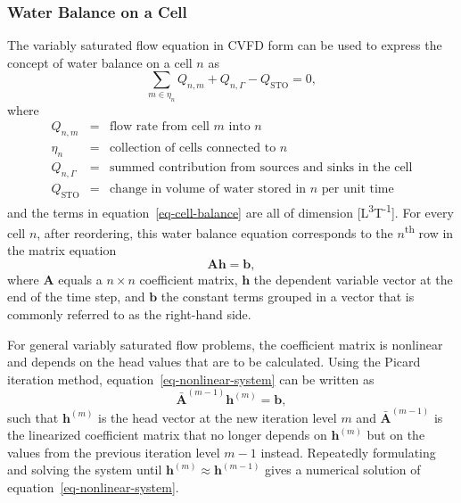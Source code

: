 \documentclass[fleqn]{article}
\begin{document}
\subsubsection*{Water Balance on a Cell}
The variably saturated flow equation in CVFD form can be used to
express the concept of water balance on a cell $n$ as
\begin{equation}
  \sum_{m \in \eta_n} Q_{n,m} + Q_{n, \Gamma} - Q_{\textrm{STO}} = 0,
  \label{eq-cell-balance}
\end{equation}
where
\begin{eqnarray*}
  Q_{n,m} &=& \text{flow rate from cell $m$ into $n$} \\
  \eta_n &=& \text{collection of cells connected to $n$} \\
  Q_{n,\Gamma} &=& \text{summed contribution from sources and sinks in the cell} \\
  Q_{\textrm{STO}} &=& \text{change in volume of water stored in $n$ per unit time}
\end{eqnarray*}
and the terms in equation~\ref{eq-cell-balance} are all of dimension
[L\textsuperscript{3}T\textsuperscript{-1}]. For every cell $n$, after
reordering, this water balance equation corresponds to the 
$n$\textsuperscript{th} row in the matrix equation
\begin{equation}
  \mathbf{A}\mathbf{h} = \mathbf{b},
  \label{eq-nonlinear-system}
\end{equation}
where $\mathbf{A}$ equals a $n \times n$ coefficient matrix, $\mathbf{h}$
the dependent variable vector at the end of the time step, and
$\mathbf{b}$ the constant terms grouped in a vector that is commonly
referred to as the right-hand side. 

For general variably saturated flow problems, the coefficient matrix is 
nonlinear and depends on the head values that are to be calculated. 
Using the Picard iteration method, equation~\ref{eq-nonlinear-system} 
can be written as
\begin{equation}
  \mathbf{\bar{A}}^{(m-1)} \mathbf{h}^{(m)} = \mathbf{b},
\end{equation}
such that $\mathbf{h}^{(m)}$ is the head vector at the new iteration level
$m$ and $\mathbf{\bar{A}}^{(m-1)}$ is the linearized coefficient matrix
that no longer depends on $\mathbf{h}^{(m)}$ but on the values from the previous
iteration level $m-1$ instead. Repeatedly formulating 
and solving the system until $\mathbf{h}^{(m)} \approx \mathbf{h}^{(m-1)}$ 
gives a numerical solution of equation~\ref{eq-nonlinear-system}.
\end{document}
